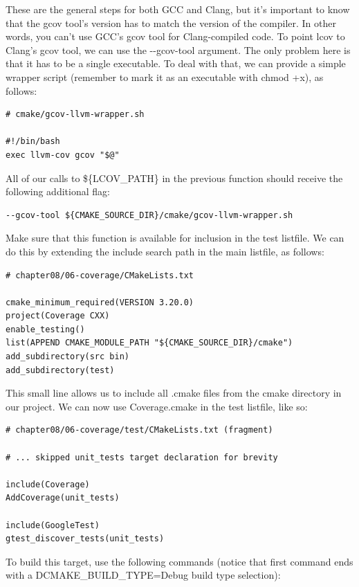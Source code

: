 These are the general steps for both GCC and Clang, but it's important to know that the gcov tool's version has to match the version of the compiler. In other words, you can't use GCC's gcov tool for Clang-compiled code. To point lcov to Clang's gcov tool, we can use the -{}-gcov-tool argument. The only problem here is that it has to be a single executable. To deal with that, we can provide a simple wrapper script (remember to mark it as an executable with chmod +x), as follows:

\begin{lstlisting}[style=stylePython]
# cmake/gcov-llvm-wrapper.sh

#!/bin/bash
exec llvm-cov gcov "$@"
\end{lstlisting}

All of our calls to \$\{LCOV\_PATH\} in the previous function should receive the following additional flag:

\begin{lstlisting}[style=stylePython]
--gcov-tool ${CMAKE_SOURCE_DIR}/cmake/gcov-llvm-wrapper.sh
\end{lstlisting}

Make sure that this function is available for inclusion in the test listfile. We can do this by extending the include search path in the main listfile, as follows:

\begin{lstlisting}[style=styleCMake]
# chapter08/06-coverage/CMakeLists.txt

cmake_minimum_required(VERSION 3.20.0)
project(Coverage CXX)
enable_testing()
list(APPEND CMAKE_MODULE_PATH "${CMAKE_SOURCE_DIR}/cmake")
add_subdirectory(src bin)
add_subdirectory(test)
\end{lstlisting}

This small line allows us to include all .cmake files from the cmake directory in our project. We can now use Coverage.cmake in the test listfile, like so:

\begin{lstlisting}[style=styleCMake]
# chapter08/06-coverage/test/CMakeLists.txt (fragment)

# ... skipped unit_tests target declaration for brevity

include(Coverage)
AddCoverage(unit_tests)

include(GoogleTest)
gtest_discover_tests(unit_tests)
\end{lstlisting}

To build this target, use the following commands (notice that first command ends with a DCMAKE\_BUILD\_TYPE=Debug build type selection):

